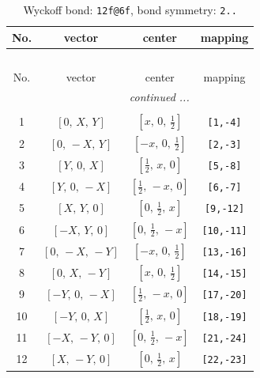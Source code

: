 \documentclass[fleqn,8pt]{jsarticle}
\begin{document}
\renewcommand{\arraystretch}{1.2}
\begin{longtable}{cccc}
\caption{Wyckoff bond: {\tt 12f@6f}, bond symmetry: {\tt 2..}}
 \\
 \hline \hline
No. & vector & center & mapping \\ \hline \endfirsthead

\multicolumn{3}{l}{\tablename\ \thetable{}} \\
 \hline \hline
No. & vector & center & mapping \\ \hline \endhead

 \hline \hline
\multicolumn{3}{r}{\footnotesize\it continued ...} \\ \endfoot

 \hline \hline
\multicolumn{3}{r}{} \\ \endlastfoot

1 & $\left[ 0,\, X,\, Y \right]$ & $\left[ x,\, 0,\, \frac{1}{2} \right]$ & {\tt [1,-4]} \\ \hline
2 & $\left[ 0,\, - X,\, Y \right]$ & $\left[ - x,\, 0,\, \frac{1}{2} \right]$ & {\tt [2,-3]} \\ \hline
3 & $\left[ Y,\, 0,\, X \right]$ & $\left[ \frac{1}{2},\, x,\, 0 \right]$ & {\tt [5,-8]} \\ \hline
4 & $\left[ Y,\, 0,\, - X \right]$ & $\left[ \frac{1}{2},\, - x,\, 0 \right]$ & {\tt [6,-7]} \\ \hline
5 & $\left[ X,\, Y,\, 0 \right]$ & $\left[ 0,\, \frac{1}{2},\, x \right]$ & {\tt [9,-12]} \\ \hline
6 & $\left[ - X,\, Y,\, 0 \right]$ & $\left[ 0,\, \frac{1}{2},\, - x \right]$ & {\tt [10,-11]} \\ \hline
7 & $\left[ 0,\, - X,\, - Y \right]$ & $\left[ - x,\, 0,\, \frac{1}{2} \right]$ & {\tt [13,-16]} \\ \hline
8 & $\left[ 0,\, X,\, - Y \right]$ & $\left[ x,\, 0,\, \frac{1}{2} \right]$ & {\tt [14,-15]} \\ \hline
9 & $\left[ - Y,\, 0,\, - X \right]$ & $\left[ \frac{1}{2},\, - x,\, 0 \right]$ & {\tt [17,-20]} \\ \hline
10 & $\left[ - Y,\, 0,\, X \right]$ & $\left[ \frac{1}{2},\, x,\, 0 \right]$ & {\tt [18,-19]} \\ \hline
11 & $\left[ - X,\, - Y,\, 0 \right]$ & $\left[ 0,\, \frac{1}{2},\, - x \right]$ & {\tt [21,-24]} \\ \hline
12 & $\left[ X,\, - Y,\, 0 \right]$ & $\left[ 0,\, \frac{1}{2},\, x \right]$ & {\tt [22,-23]} \\
\end{longtable}
\end{document}
